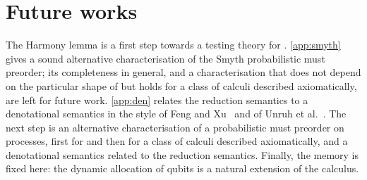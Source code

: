 \section{Future works}\label{sec:future}

The Harmony lemma is a first step towards a testing theory for \lqCCS.
\ifshowappendix
\cref{app:smyth} gives a sound alternative characterisation of the Smyth
probabilistic must preorder; its completeness in general, and a
characterisation that does not depend on the particular shape of \lqCCS but
holds for a class of calculi described axiomatically, are left for future
work. \cref{app:den} relates the reduction semantics to a denotational
semantics in the style of Feng and Xu~\cite{FengXu23} and of Unruh et al.~\cite{UVY26}.
\else
The next step is an alternative characterisation of a probabilistic must
preorder on processes, first for \lqCCS and then for a class of calculi
described axiomatically, and a denotational semantics related to the
reduction semantics.
\fi
Finally, the memory is fixed here: the dynamic allocation of qubits is a
natural extension of the calculus.
